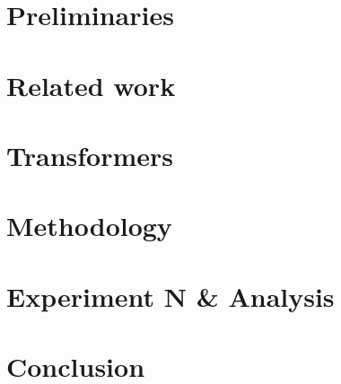 \section{Preliminaries}


\section{Related work}\label{sec:relatedwork}



\section{Transformers}



\section{Methodology}

\section{Experiment N \& Analysis}

\section{Conclusion}





\appendix
%

